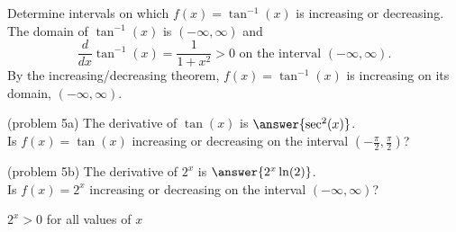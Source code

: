 \documentclass[handout]{ximera}
\begin{document}
\begin{example}[example 5]
Determine intervals on which $f(x) = \tan^{-1}(x)$ is increasing or decreasing.\\
The domain of $\tan^{-1}(x)$ is $(-\infty,\infty)$ and 
\[
\frac{d}{dx} \tan^{-1}(x) = \frac{1}{1+x^2} > 0 \text{ on the interval } (-\infty, \infty).
\]
By the increasing/decreasing theorem, $f(x) = \tan^{-1}(x)$ is increasing on its 
domain, $(-\infty, \infty)$.

\begin{image}
\end{image}
\end{example}


\begin{problem}(problem 5a)
The derivative of $\tan(x)$ is $\answer{\sec^2(x)}$.\\
Is $f(x) = \tan(x)$ increasing or decreasing on the interval $(-\frac{\pi}{2}, \frac{\pi}{2})$?
\begin{multipleChoice}
\end{multipleChoice}
\end{problem}


\begin{problem}(problem 5b)
The derivative of $2^x$ is $\answer{2^x\ln(2)}$.\\
Is $f(x) = 2^x$ increasing or decreasing on the interval $(-\infty, \infty)$?
\begin{hint}
$2^x > 0$ for all values of $x$
\end{hint}
\begin{multipleChoice}
\end{multipleChoice}
\end{problem}
\end{document}
